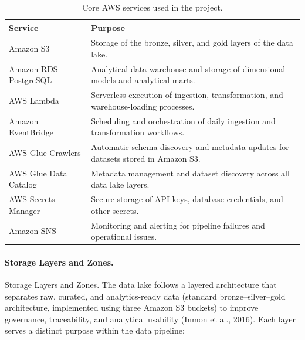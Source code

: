 \documentclass[11pt,a4paper]{article}
\begin{document}
\begin{table}[H]
\centering
\small
\begin{tabular}{p{4.5cm}p{8.8cm}}
\hline
\textbf{Service} & \textbf{Purpose} \\
\hline

Amazon S3 &
Storage of the bronze, silver, and gold layers of the data lake. \\

Amazon RDS PostgreSQL &
Analytical data warehouse and storage of dimensional models and analytical marts. \\

AWS Lambda &
Serverless execution of ingestion, transformation, and warehouse-loading processes. \\

Amazon EventBridge &
Scheduling and orchestration of daily ingestion and transformation workflows. \\

AWS Glue Crawlers &
Automatic schema discovery and metadata updates for datasets stored in Amazon S3. \\

AWS Glue Data Catalog &
Metadata management and dataset discovery across all data lake layers. \\

AWS Secrets Manager &
Secure storage of API keys, database credentials, and other secrets. \\

Amazon SNS &
Monitoring and alerting for pipeline failures and operational issues. \\

\hline
\end{tabular}
\caption{Core AWS services used in the project.}
\label{tab:aws_services}
\end{table}

\paragraph{Storage Layers and Zones.}
Storage Layers and Zones. The data lake follows a layered architecture
that separates raw, curated, and analytics-ready data (standard bronze--silver--gold architecture, implemented using three Amazon S3 buckets) to improve
governance, traceability, and analytical usability (Inmon et al.,
2016). Each layer serves a distinct
purpose within the data pipeline:
\end{document}
